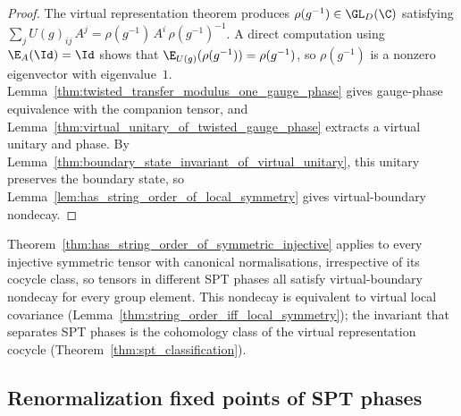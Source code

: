 \begin{proof}\leanok
    The virtual representation theorem produces
    $\rho(g^{-1}) \in \GL_{D}(\C)$ satisfying
    $\sum_j U(g)_{ij}\,A^j
        = \rho(g^{-1})\,A^i\,\rho(g^{-1})^{-1}$.
    A direct computation using $\E_A(\Id)=\Id$ shows that
    $\E_{U(g)}(\rho(g^{-1}))=\rho(g^{-1})$, so
    $\rho(g^{-1})$ is a nonzero eigenvector with eigenvalue~$1$.
    Lemma~\ref{thm:twisted_transfer_modulus_one_gauge_phase} gives
    gauge-phase equivalence with the companion tensor, and
    Lemma~\ref{thm:virtual_unitary_of_twisted_gauge_phase} extracts a virtual
    unitary and phase.
    By Lemma~\ref{thm:boundary_state_invariant_of_virtual_unitary}, this
    unitary preserves the boundary state, so
    Lemma~\ref{lem:has_string_order_of_local_symmetry} gives
    virtual-boundary nondecay.
\end{proof}

\begin{remark}%
    \label{rem:string_order_symmetry_diagnostic}
    Theorem~\ref{thm:has_string_order_of_symmetric_injective} applies to
    every injective symmetric tensor with canonical normalisations,
    irrespective of its cocycle class, so tensors in different SPT phases
    all satisfy virtual-boundary nondecay for every group element.  This
    nondecay is equivalent to virtual local covariance
    (Lemma~\ref{thm:string_order_iff_local_symmetry}); the invariant
    that separates SPT phases is the cohomology class of the virtual
    representation cocycle (Theorem~\ref{thm:spt_classification}).
\end{remark}

\subsection{Renormalization fixed points of SPT phases}
\label{sec:spt_fixed_points}

